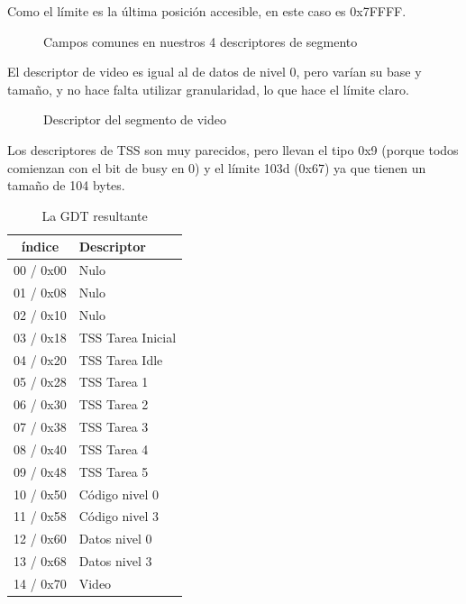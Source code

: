 \documentclass[10pt, a4paper]{article}
\begin{document}
Como el límite es la última posición accesible, en este caso es 0x7FFFF.
		\begin{figure}[H]
	  		\centering
			\caption{Campos comunes en nuestros 4 descriptores de segmento}
			\label{fig:descriptorGDTCamposComunes}
		\end{figure}
		
El descriptor de video es igual al de datos de nivel 0, pero varían su base y tamaño, y no hace falta utilizar granularidad, lo que hace el límite claro.
		\begin{figure}[H]
	  		\centering
			\caption{Descriptor del segmento de video}
			\label{fig:descriptorVideo}
		\end{figure}
		
Los descriptores de TSS son muy parecidos, pero llevan el tipo 0x9 (porque todos comienzan con el bit de busy en 0) y el límite 103d (0x67)  ya que tienen un tamaño de 104 bytes.
		
\begin{table}[H]
\centering
    \begin{tabular}{|c|l|}
        \hline
        índice & Descriptor \\ \hline
        00 / 0x00 & Nulo \\ 
        01 / 0x08 & Nulo \\
        02 / 0x10 & Nulo \\ 
        03 / 0x18 & TSS Tarea Inicial \\ 
        04 / 0x20 & TSS Tarea Idle \\ 
        05 / 0x28 & TSS Tarea 1 \\ 
        06 / 0x30 & TSS Tarea 2 \\ 
        07 / 0x38 & TSS Tarea 3  \\ 
        08 / 0x40 & TSS Tarea 4 \\ 
        09 / 0x48 & TSS Tarea 5 \\ 
        10 / 0x50 & Código nivel 0 \\ 
        11 / 0x58 & Código nivel 3 \\ 
        12 / 0x60 & Datos nivel 0 \\ 
        13 / 0x68 & Datos nivel 3 \\ 
        14 / 0x70 & Video\\ 
        \hline
    \end{tabular}
    \caption{La GDT resultante}
\end{table}
\end{document}

